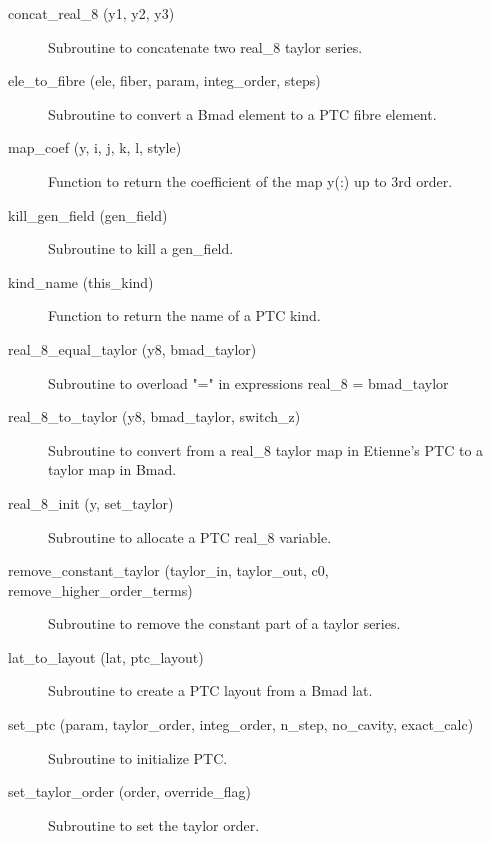 \begin{description}

\item[concat_real_8 (y1, y2, y3)] \Newline
Subroutine to concatenate two real_8 taylor series. 

\item[ele_to_fibre (ele, fiber, param, integ_order, steps)] \Newline
Subroutine to convert a Bmad element to a PTC fibre element. 

\item[map_coef (y, i, j, k, l, style)] \Newline
Function to return the coefficient of the map y(:) up to 3rd order. 

\item[kill_gen_field (gen_field)] \Newline
Subroutine to kill a gen_field. 

\item[kind_name (this_kind)] \Newline
Function to return the name of a PTC kind. 

\item[real_8_equal_taylor (y8, bmad_taylor)] \Newline
Subroutine to overload "=" in expressions real_8 = bmad_taylor 

\item[real_8_to_taylor (y8, bmad_taylor, switch_z)] \Newline
Subroutine to convert from a real_8 taylor map in Etienne's PTC to a taylor map in Bmad. 

\item[real_8_init (y, set_taylor)] \Newline
Subroutine to allocate a PTC real_8 variable. 

\item[remove_constant_taylor (taylor_in, taylor_out, c0, remove_higher_order_terms)] \Newline
Subroutine to remove the constant part of a taylor series. 

\item[lat_to_layout (lat, ptc_layout)] \Newline
Subroutine to create a PTC layout from a Bmad lat. 

\item[set_ptc (param, taylor_order, integ_order, n_step, no_cavity, exact_calc)] \Newline
Subroutine to initialize PTC. 

\item[set_taylor_order (order, override_flag)] \Newline
Subroutine to set the taylor order. 


\end{description}
